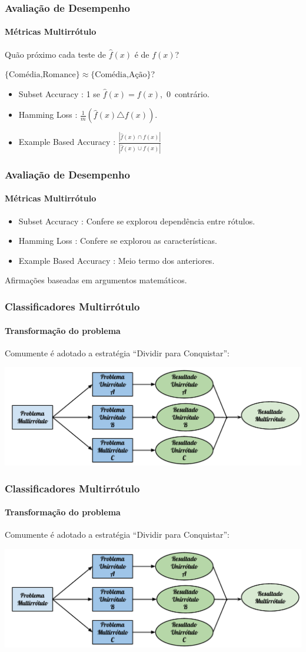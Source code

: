 \documentclass[10pt,fleqn]{beamer}
\newcommand{\litem}[1]{
  \item{#1 \vspace{9pt}}
}
\begin{document}
\begin{frame}
  \frametitle{Avaliação de Desempenho}
  \framesubtitle{Métricas Multirrótulo}
  Quão próximo cada teste de $\hat{f}(x)$ é de $f(x)$?
  \begin{center}
  $\{\textrm{Comédia,Romance}\} \approx \{\textrm{Comédia,Ação}\}$?
  \end{center}
  
  \begin{itemize}
  \litem{Subset Accuracy}: 1 se $\hat{f}(x)=f(x)$,~$0$~contrário.
  \litem{Hamming Loss}: $\frac{1}{m}(\hat{f}(x) \triangle f(x))$. 
  \litem{Example Based Accuracy}: \large{$\frac{|\hat{f}(x) \cap f(x)|}{|\hat{f}(x) \cup f(x)|}$}
  
  \end{itemize}
\end{frame}

\begin{frame}
  \frametitle{Avaliação de Desempenho}
  \framesubtitle{Métricas Multirrótulo}
  \begin{itemize}
  \litem{Subset Accuracy}: Confere se explorou dependência entre rótulos.
  \litem{Hamming Loss}: Confere se explorou as características.
  \litem{Example Based Accuracy}: Meio termo dos anteriores.
  \end{itemize}
  \begin{block}{}
Afirmações baseadas em argumentos matemáticos.
 \end{block}
 
\end{frame}

\begin{frame}
  \frametitle{Classificadores Multirrótulo}
  \framesubtitle{Transformação do problema}
  
  Comumente é adotado a estratégia ``Dividir para Conquistar'':
    \begin{center}
  \includegraphics[scale=0.53]{transformar}
    \end{center}
\end{frame}

\begin{frame}
  \frametitle{Classificadores Multirrótulo}
  \framesubtitle{Transformação do problema}
  
  Comumente é adotado a estratégia ``Dividir para Conquistar'':
    \begin{center}
  \includegraphics[scale=0.53]{transformar}
    \end{center}
\end{frame}
\end{document}
